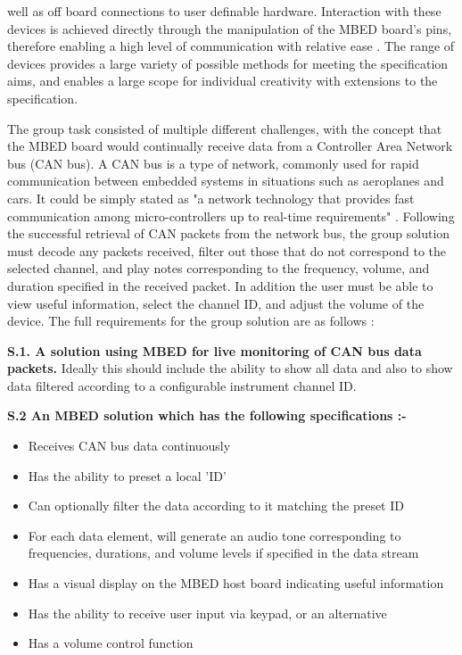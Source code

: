well as off board connections to user definable hardware. 
Interaction with these devices is achieved directly through the manipulation of 
the MBED board's pins, therefore enabling a high level of communication with 
relative ease \cite{mbed-pins}. 
The range of devices provides a large variety of possible methods for meeting 
the specification aims, and enables a large scope for individual creativity with 
extensions to the specification.
\par\bigskip\noindent
The group task consisted of multiple different challenges, with the concept
that the MBED board would continually receive data from a Controller Area Network
bus (CAN bus). 
A CAN bus is a type of network, commonly used for rapid 
communication between embedded systems in situations such as aeroplanes and cars.
It could be simply stated as "a network technology that provides fast 
communication among micro-controllers up to real-time requirements" 
\cite{voss2005comprehensible}. 
Following the successful retrieval of CAN packets 
from the network bus, the group solution must decode any packets received, 
filter out those that do not correspond to the selected channel, 
and play notes corresponding to the frequency, volume, and duration specified 
in the received packet.
In addition the user must be able to view useful information, select the channel 
ID, and adjust the volume of the device. 
The full requirements for the group solution are as follows 
\cite{specification}:
\par\bigskip\noindent
\textbf{S.1. A solution using MBED for live monitoring of CAN bus data packets.}
\hangindent=0.7cm
Ideally this should include the ability to show all data and also 
to show data filtered according to a configurable instrument channel ID.
\par\bigskip\noindent
\textbf{S.2 An MBED solution which has the following specifications :-}
\begin{itemize}
        \item 
            Receives CAN bus data continuously
        \item 
            Has the ability to preset a local 'ID'
        \item 
            Can optionally filter the data according to it matching the preset ID
        \item 
            For each data element, will generate an audio tone corresponding to frequencies,
            durations, and volume levels if specified in the data stream
        \item 
            Has a visual display on the MBED host board indicating useful information
        \item 
            Has the ability to receive user input via keypad, or an alternative
        \item 
            Has a volume control function
\end{itemize}
